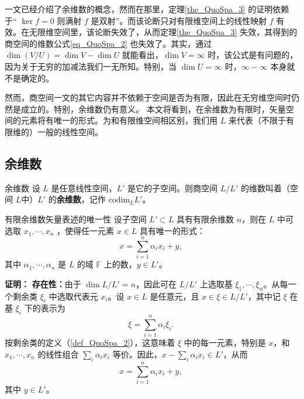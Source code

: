 

一文已经介绍了余维数的概念，然而在那里，定理\autoref{the_QuoSpa_3} 的证明依赖于“ $\ker f=0$ 则满射 $f$ 是双射”。而该论断只对有限维空间上的线性映射 $f$ 有效。在无限维空间里，该论断失效了，从而定理\autoref{the_QuoSpa_3} 失效，其得到的商空间的维数公式\autoref{eq_QuoSpa_2} 也失效了。其实，通过 $\dim(V/U) = \dim V - \dim U$ 就能看出，$\dim V=\infty$ 时，该公式是有问题的，因为关于无穷的加减法我们一无所知。特别，当 $\dim U=\infty$ 时，$\infty-\infty$ 本身就不是确定的。

然而，商空间一文的其它内容并不依赖于空间是否为有限，因此在无穷维空间时仍然是成立的。特别，余维数仍有意义。 本文将看到，在余维数为有限时，矢量空间的元素将有唯一的形式。为和有限维空间相区别，我们用 $L$ 来代表（不限于有限维的）一般的线性空间。

\subsection{余维数}

\begin{definition}{余维数}
设 $L$ 是任意线性空间，$L'$ 是它的子空间。则商空间 $L/L'$ 的维数叫着（空间 $L$中）$L'$ 的\textbf{余维数}，记作 $\mathrm{codim}_L L'$。 
\end{definition}


\begin{theorem}{有限余维数矢量表述的唯一性}
设子空间 $L'\subset L$ 具有有限余维数 $n$，则在 $L$ 中可选取 $x_1,\cdots,x_n$ ，使得任一元素 $x\in L$ 具有唯一的形式：
\begin{equation}
x=\sum_{i=1}^n\alpha_i x_i+y,~
\end{equation}
其中 $\alpha_1,\cdots,\alpha_n$ 是 $L$ 的域 $\mathbb F$ 上的数，$y\in L'$。
\end{theorem}

\textbf{证明：}
\textbf{存在性：}由于 $\dim L/L'=n$，因此可在 $L/L'$ 上选取基 $\xi_1,\cdots,\xi_n$。从每一个剩余类 $\xi_i$ 中选取代表元 $x_i$。设 $x\in L$ 是任意元，且 $x\in\xi\in L/L'$，其中记 $\xi$ 在基 $\xi_i$ 下的表示为
\begin{equation}
\xi=\sum_{i=1}^n\alpha_i\xi_i.~
\end{equation}
按剩余类的定义（\autoref{def_QuoSpa_2}），这意味着 $\xi$ 中的每一元素，特别是 $x$，和 $x_1,\cdots,x_n$ 的线性组合 $\sum_i\alpha_i x_i$ 等价。因此，$x-\sum_i\alpha_i x_i\in L'$，从而
\begin{equation}
x=\sum_{i=1}^n\alpha_i x_i+y,~
\end{equation}
其中 $y\in L'$。

